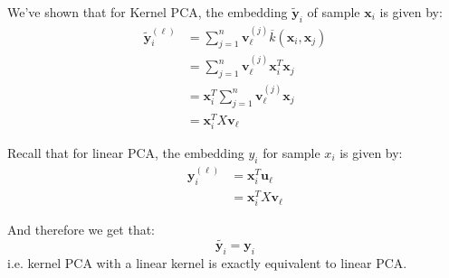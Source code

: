 \documentclass{article}
\begin{document}
We've shown that for Kernel PCA, the embedding $\widetilde{\bm{y}}_i$ of sample $\bm{x}_i$ is given by:
\begin{align*}
  \widetilde{\bm{y}}_i^{(\ell)} &= \sum_{j=1}^{n} \bm{v}_\ell^{(j)} \overline{k} (\bm{x}_i, \bm{x}_j) \\
  &= \sum_{j=1}^{n} \bm{v}_\ell^{(j)} \bm{x}_i^{T} \bm{x}_j \\
  &= \bm{x}_i^{T} \sum_{j=1}^{n} \bm{v}_\ell^{(j)} \bm{x}_j \\
  &= \bm{x}_i ^{T} X \bm{v}_{\ell}
\end{align*}

Recall that for linear PCA, the embedding $y_i$ for sample $x_i$ is given by:
\begin{align*}
  \bm{y}_i^{(\ell)} &= \bm{x}_i ^{T} \bm{u}_{\ell}  \\
  &= \bm{x}_i ^{T} X \bm{v}_\ell
\end{align*}

And therefore we get that:
\[
  \widetilde{\bm{y}_i} = \bm{y}_i
\]
i.e. kernel PCA with a linear kernel is exactly equivalent to linear PCA. 
\end{document}
